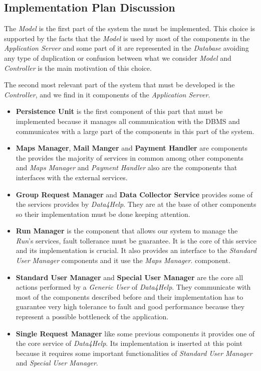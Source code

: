 \subsection{Implementation Plan Discussion}
\myparagraph{}
The \textit{Model} is the first part of the system the must be implemented. This choice is supported by the facts that the \textit{Model} is used by most of the components in the \textit{Application Server} and some part of it are represented in the \textit{Database} avoiding any type of duplication or confusion between what we consider \textit{Model} and \textit{Controller} is the main motivation of this choice.

\myparagraph{}
The second most relevant part of the system that must be developed is the \textit{Controller}, and we find in it components of the \textit{Application Server}.
\begin{itemize}
  \item \textbf{Persistence Unit} is the first component of this part that must be implemented because it manages all communication with the DBMS and communicates with a large part of the components in this part of the system.
  \item \textbf{Maps Manager}, \textbf{Mail Manger} and \textbf{Payment Handler} are components the provides the majority of services in common among other components and \textit{Maps Manager} and \textit{Payment Handler} also are the components that interfaces with the external services.
  \item \textbf{Group Request Manager} and \textbf{Data Collector Service} provides some of the services provides by \textit{Data4Help}. They are at the base of other components so their implementation must be done keeping attention.
  \item \textbf{Run Manager} is the component that allows our system to manage the \textit{Run}'s services, fault tollerance must be guarantee. It is the core of this service and its implementation is crucial. It also provides an interface to the \textit{Standard User Manager} components and it use the \textit{Maps Manager}. component.
  \item \textbf{Standard User Manager} and \textbf{Special User Manager} are the core all actions performed by a \textit{Generic User} of \textit{Data4Help}. They communicate with most of the components described before and their implementation has to guarantee very high tolerance to fault and good performance because they represent a possible bottleneck of the application.
  \item \textbf{Single Request Manager} like some previous components it provides one of the core service of \textit{Data4Help}. Its implementation is inserted at this point because it requires some important functionalities of \textit{Standard User Manager} and \textit{Special User Manager}.
\end{itemize}

